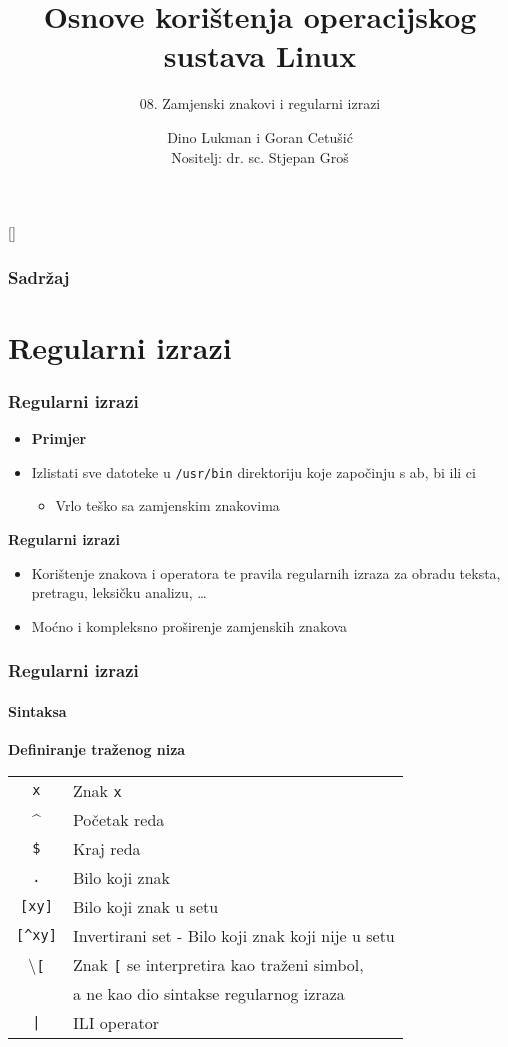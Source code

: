 \documentclass[table,usenames,dvipsnames]{beamer}
\title{Osnove korištenja operacijskog sustava Linux}
\subtitle{08. Zamjenski znakovi i regularni izrazi}
\author[Dino Lukman i Goran Cetušić]{Dino Lukman i Goran Cetušić\\{\small Nositelj: dr. sc. Stjepan Groš}}
\institute[FER]{Sveučilište u Zagrebu \\
				Fakultet elektrotehnike i računarstva}
\date{\todayiso}
\newcommand{\shell}[1]{\texttt{#1}}
\begin{document}
{
[] %

\begin{frame}
\maketitle
\end{frame}
}

\begin{frame}
\frametitle{Sadržaj}
\tableofcontents
\end{frame}


\section{Regularni izrazi}
\begin{frame}[t]
\frametitle{Regularni izrazi}
\begin{itemize}
  \item \textbf{Primjer}
  \item[] Izlistati sve datoteke u \shell{/usr/bin} direktoriju koje započinju s ab, bi ili ci
  \begin{itemize}
	  \item Vrlo teško sa zamjenskim znakovima
  \end{itemize}
\end{itemize}
\vfill
\textbf{Regularni izrazi}
  \begin{itemize}
    \item Korištenje znakova i operatora te pravila regularnih izraza za 
          obradu teksta, pretragu, leksičku analizu, \ldots
    \item Moćno i kompleksno proširenje zamjenskih znakova
  \end{itemize}
\vfill
\end{frame}

\begin{frame}[t]
\frametitle{Regularni izrazi}
\framesubtitle{Sintaksa}
\textbf{Definiranje traženog niza}
\begin{table}[h]
\begin{tabular}{c l}
  \shell{x} & Znak \shell{x}\\
  \textasciicircum{} & Početak reda \\
  \shell{\$} & Kraj reda \\
  \shell{.} & Bilo koji znak \\
  \shell{[xy]} & Bilo koji znak u setu \\
  \shell{[\textasciicircum{}xy]} &  Invertirani set - Bilo koji znak koji nije u setu \\
  \textbackslash{}\shell{[} & Znak \shell{[} se interpretira kao traženi simbol, \\
  & a ne kao dio sintakse regularnog izraza \\
  \shell{|} & ILI operator \\
\end{tabular}
\end{table}
\end{frame}
\end{document}
